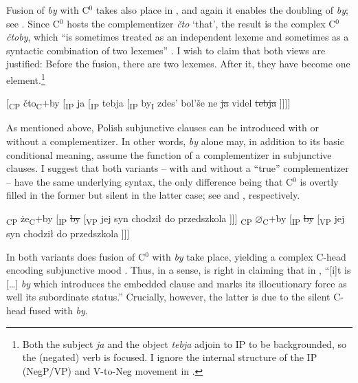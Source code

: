 \documentclass[output=paper]{langscibook}
\begin{document}
Fusion of \textit{by} with C$^0$ takes also place in , and again it enables the doubling of \textit{by}; see . Since C$^0$ hosts the complementizer \textit{čto} `that', the result is the complex C$^0$ \textit{čtoby}, which ``is sometimes treated as an independent lexeme and sometimes as a syntactic combination of two lexemes'' \citep[329]{Hansen2010}. I wish to claim that both views are justified: Before the fusion, there are two lexemes. After it, they have become one element.\footnote{Both the subject \textit{ja} and the object \textit{tebja} adjoin to IP to be backgrounded, so the (negated) verb is focused. I ignore the internal structure of the IP (NegP/VP) and V-to-Neg movement in .}

\ea
{[}\textsubscript{CP} čto\textsubscript{C}$+$by [\textsubscript{IP} ja [\textsubscript{IP} tebja [\textsubscript{IP} by\textsubscript{I} zdes' bol'še ne \sout{ja} videl \sout{tebja} ]]]]
\label{pitsch:ex:doubling_Russian_rep_b_analysis}
\z

\noindent As mentioned above, Polish subjunctive clauses can be introduced with or without a complementizer. In other words, \textit{by} alone may, in addition to its basic conditional meaning, assume the function of a complementizer in subjunctive clauses. I suggest that both variants -- with and without a ``true'' complementizer -- have the same underlying syntax, the only difference being that C$^0$ is overtly filled in the former but silent in the latter case; see  and , respectively.

\ea
\ea {[}\textsubscript{CP} że\textsubscript{C}$+$by [\textsubscript{IP} \sout{by} [\textsubscript{VP} jej syn chodził do przedszkola ]]] \label{pitsch:ex:PolJedrz_analysis_a}
\ex {[}\textsubscript{CP} $\varnothing$\textsubscript{C}$+$by [\textsubscript{IP} \sout{by} [\textsubscript{VP} jej syn chodził do przedszkola ]]]
\label{pitsch:ex:PolJedrz_analysis_b}
\z
\z

\noindent In both variants does fusion of C$^0$ with \textit{by} take place, yielding a complex C-head encoding subjunctive mood \citep[251]{Migdalski2006}. Thus, in a sense, \citet[109]{Jedrzejowski2020} is right in claiming that in , ``[i]t is [\dots] \textit{by} which introduces the embedded clause and marks its illocutionary force as well its subordinate status.'' Crucially, however, the latter is due to the silent C-head fused with \textit{by}.
\end{document}
